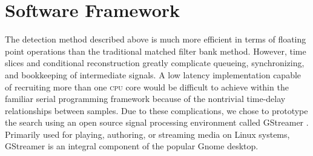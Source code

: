 \section{Software Framework}
\label{SECIII}\label{sec:analysis}


The detection method described above is much more efficient in terms of
floating point operations than the traditional matched filter bank method.
However, time slices and conditional reconstruction greatly complicate
queueing, synchronizing, and bookkeeping of intermediate signals.  A low
latency implementation capable of recruiting more than one \textsc{cpu} core
would be difficult to achieve within the familiar serial programming framework
because of the nontrivial time-delay relationships between samples.  Due to
these complications, we chose to prototype the search using an open source
signal processing environment called GStreamer \cite{gstreamer}.  Primarily
used for playing, authoring, or streaming media on Linux systems, GStreamer is
an integral component of the popular Gnome desktop.

\begin{comment}


\begin{figure*}[h!]
\begin{center}
\texttt{[image: figures/flow\_chart.pdf]}
\caption{\label{f:flowchart} 
}
\end{center}
\end{figure*}

\end{comment}
